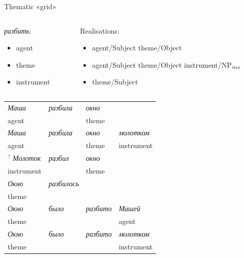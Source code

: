 \documentclass[10pt, compress]{beamer}
\begin{document}
\begin{frame}{Thematic «grid»}
~\\
\begin{columns}
\begin{column}{0.25\textwidth}
\emph{разбить}:
\begin{itemize}
  \item {\sc agent}
  \item {\sc theme}
  \item {\sc instrument}
\end{itemize}
\end{column}
\begin{column}{0.75\textwidth}
Realisations:
\begin{itemize}
\item {\sc agent}/Subject {\sc theme}/Object
\item {\sc agent}/Subject {\sc theme}/Object {\sc instrument}/NP$_{\sc ins}$
\item {\sc theme}/Subject
\end{itemize}
\end{column}
\end{columns}

\begin{center}
\begin{small}
\begin{tabular}{llll}
 \hline
  \emph{Маша}        & \emph{разбила}  & \emph{окно} & \\
  {\sc agent} &          & {\sc theme} & \\
 \hline
  \emph{Маша}  & \emph{разбила}  & \emph{окно}  & \emph{молотком} \\
  {\sc agent} & & {\sc theme} & {\sc instrument} \\
 \hline
$^?$ \emph{Молоток}  & \emph{разбил}  & \emph{окно}  &  \\
  {\sc instrument} & & {\sc theme} & \\
 \hline
  \emph{Окно}  & \emph{разбилось}  &  &  \\
  {\sc theme } & & &  \\
 \hline
  \emph{Окно}  & \emph{было}  & \emph{разбито}  & \emph{Машей} \\
  {\sc theme } & & & {\sc agent} \\
 \hline
  \emph{Окно}  & \emph{было}  & \emph{разбито}  & \emph{молотком} \\
  {\sc theme } & & & {\sc instrument} \\
\end{tabular}
\end{small}
\end{center}

\end{frame}
\end{document}
